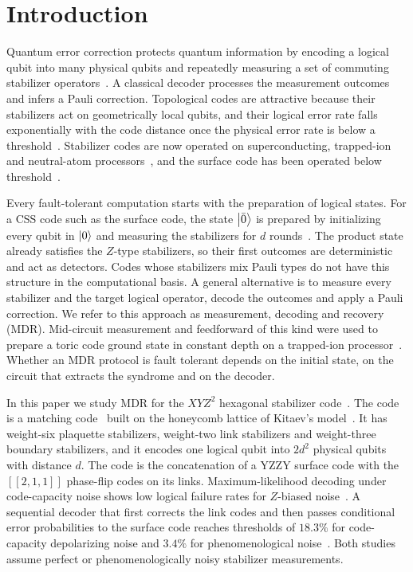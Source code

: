\section{Introduction}
\label{sec:intro}

Quantum error correction protects quantum information by encoding a logical qubit into many physical qubits and repeatedly measuring a set of commuting stabilizer operators~\cite{gottesman1997,nc2010}. A classical decoder processes the measurement outcomes and infers a Pauli correction. Topological codes are attractive because their stabilizers act on geometrically local qubits, and their logical error rate falls exponentially with the code distance once the physical error rate is below a threshold~\cite{kitaev2003,dennis2002,fowler2012}. Stabilizer codes are now operated on superconducting, trapped-ion and neutral-atom processors~\cite{ryananderson2021,postler2022,google2023,bluvstein2024}, and the surface code has been operated below threshold~\cite{google2025}.

Every fault-tolerant computation starts with the preparation of logical states. For a CSS code such as the surface code, the state $\left|\bar{0}\right\rangle$ is prepared by initializing every qubit in $\left|0\right\rangle$ and measuring the stabilizers for $d$ rounds~\cite{dennis2002,fowler2012}. The product state already satisfies the $Z$-type stabilizers, so their first outcomes are deterministic and act as detectors. Codes whose stabilizers mix Pauli types do not have this structure in the computational basis. A general alternative is to measure every stabilizer and the target logical operator, decode the outcomes and apply a Pauli correction. We refer to this approach as measurement, decoding and recovery (MDR). Mid-circuit measurement and feedforward of this kind were used to prepare a toric code ground state in constant depth on a trapped-ion processor~\cite{iqbal2024}. Whether an MDR protocol is fault tolerant depends on the initial state, on the circuit that extracts the syndrome and on the decoder.

In this paper we study MDR for the $XYZ^2$ hexagonal stabilizer code~\cite{Sri2022}. The code is a matching code~\cite{wootton,wootton2022} built on the honeycomb lattice of Kitaev's model~\cite{kitaev2006}. It has weight-six plaquette stabilizers, weight-two link stabilizers and weight-three boundary stabilizers, and it encodes one logical qubit into $2d^2$ physical qubits with distance $d$. The code is the concatenation of a YZZY surface code with the $[[2,1,1]]$ phase-flip codes on its links. Maximum-likelihood decoding under code-capacity noise shows low logical failure rates for $Z$-biased noise~\cite{Sri2022}. A sequential decoder that first corrects the link codes and then passes conditional error probabilities to the surface code reaches thresholds of $18.3\%$ for code-capacity depolarizing noise and $3.4\%$ for phenomenological noise~\cite{Sri2025}. Both studies assume perfect or phenomenologically noisy stabilizer measurements.

